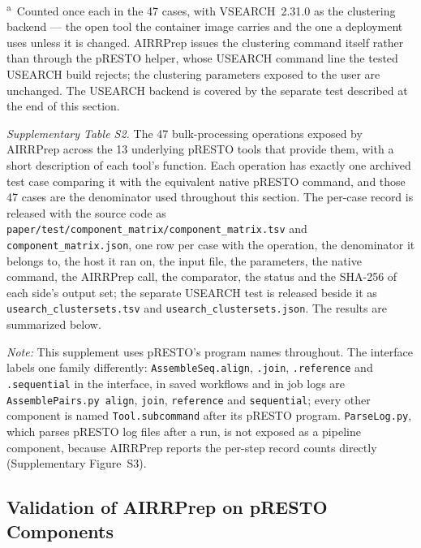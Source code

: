 \documentclass[11pt]{article}
\begin{document}
\textsuperscript{a}~Counted once each in the 47 cases, with VSEARCH~2.31.0 as
the clustering backend --- the open tool the container image carries and the
one a deployment uses unless it is changed. AIRRPrep issues the clustering
command itself rather than through the pRESTO helper, whose USEARCH command
line the tested USEARCH build rejects; the clustering parameters exposed to
the user are unchanged. The USEARCH backend is covered by the separate test
described at the end of this section.

{\small\textit{Supplementary Table S2.} The 47 bulk-processing operations
exposed by AIRRPrep across the 13 underlying pRESTO tools that provide them,
with a short description of each tool's function. Each operation has exactly
one archived test case comparing it with the equivalent native pRESTO command,
and those 47 cases are the denominator used throughout this section. The
per-case record is released with the source code as
\texttt{paper/test/component\_matrix/component\_matrix.tsv} and
\texttt{component\_matrix.json}, one row per case with the operation, the
denominator it belongs to, the host it ran on, the input file, the parameters,
the native command, the AIRRPrep call, the comparator, the status and the
SHA-256 of each side's output set; the separate USEARCH test is released
beside it as
\texttt{usearch\_clustersets.tsv} and \texttt{usearch\_clustersets.json}. The
results are summarized below.\par}

\textit{Note:} This supplement uses pRESTO's program names throughout. The
interface labels one family differently: \texttt{AssembleSeq.align},
\texttt{.join}, \texttt{.reference} and \texttt{.sequential} in the interface,
in saved workflows and in job logs are \texttt{AssemblePairs.py align},
\texttt{join}, \texttt{reference} and \texttt{sequential}; every other
component is named \texttt{Tool.subcommand} after its pRESTO program. \texttt{ParseLog.py}, which parses pRESTO
log files after a run, is not exposed as a pipeline component, because AIRRPrep
reports the per-step record counts directly (Supplementary Figure~S3).

\subsection*{Validation of AIRRPrep on pRESTO Components}
\end{document}
